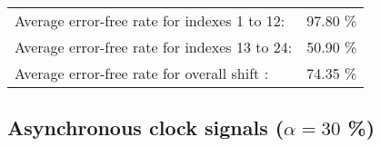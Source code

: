 \begin{table}[h]
\begin{center}
\begin{tabular}{|c|c|c|c|c|}
\end{tabular}


\flushleft
\begin{tabular}{l l}
Average error-free rate for indexes  1 to 12: &  97.80 \% \\
Average error-free rate for indexes 13 to 24: &  50.90 \% \\
Average error-free rate for overall shift   : &  74.35 \% \\

\end{tabular}


\end{center}
\end{table}


\pagebreak
\subsection{Asynchronous clock signals ($\alpha=30$ \%)}

